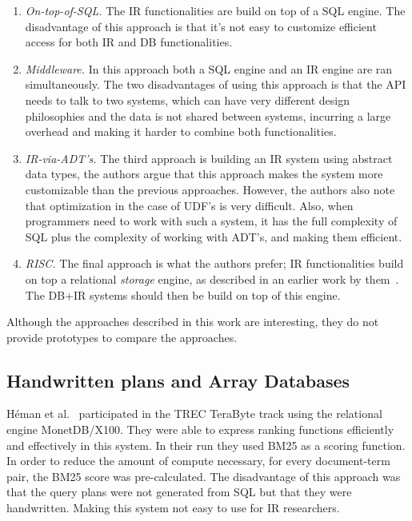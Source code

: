 \begin{enumerate}
	\item \emph{On-top-of-SQL.} The IR functionalities are build on top of a SQL engine. The disadvantage of this approach is that it's not easy to customize efficient access for both IR and DB functionalities. 
	\item \emph{Middleware.} In this approach both a SQL engine and an IR engine are ran simultaneously. The two disadvantages of using this approach is that the API needs to talk to two systems, which can have very different design philosophies and the data is not shared between systems, incurring a large overhead and making it harder to combine both functionalities. 
	\item \emph{IR-via-ADT's.} The third approach is building an IR system using abstract data types, the authors argue that this approach makes the system more customizable than the previous approaches. However, the authors also note that optimization in the case of UDF's is very difficult. Also, when programmers need to work with such a system, it has the full complexity of SQL plus the complexity of working with ADT's, and making them efficient. 
	\item \emph{RISC.} The final approach is what the authors prefer; IR functionalities build on top a relational \textit{storage} engine, as described in an earlier work by them~\cite{risc}. The DB+IR systems should then be build on top of this engine. 
\end{enumerate} 
Although the approaches described in this work are interesting, they do not provide prototypes to compare the approaches.

\subsection{Handwritten plans and Array Databases}
H\'eman et al.~\cite{handwritten} participated in the TREC TeraByte track using the relational engine MonetDB/X100. They were able to express ranking functions efficiently and effectively in this system. In their run they used BM25 as a scoring function. In order to reduce the amount of compute necessary, for every document-term pair, the BM25 score was pre-calculated. 
The disadvantage of this approach was that the query plans were not generated from SQL but that they were handwritten. Making this system not easy to use for IR researchers.

